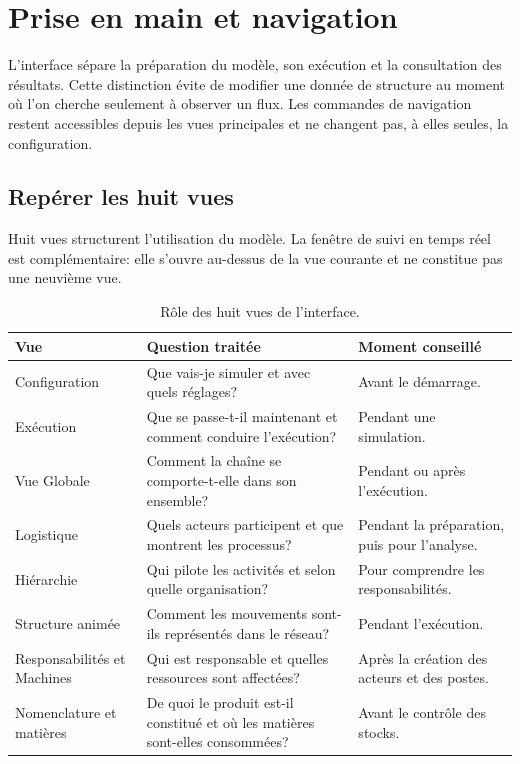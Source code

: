 \chapter{Prise en main et navigation}
\label{chap:prise-en-main}

L'interface sépare la préparation du modèle, son exécution et la consultation des résultats. Cette distinction évite de modifier une donnée de structure au moment où l'on cherche seulement à observer un flux. Les commandes de navigation restent accessibles depuis les vues principales et ne changent pas, à elles seules, la configuration.

\section{Repérer les huit vues}

Huit vues structurent l'utilisation du modèle. La fenêtre de suivi en temps réel est complémentaire: elle s'ouvre au-dessus de la vue courante et ne constitue pas une neuvième vue.

\begin{table}[H]
  \centering
  \begin{tabularx}{\textwidth}{L{0.23\textwidth} L{0.40\textwidth} Y}
    \toprule
    Vue & Question traitée & Moment conseillé \\
    \midrule
    Configuration & Que vais-je simuler et avec quels réglages? & Avant le démarrage. \\
    Exécution & Que se passe-t-il maintenant et comment conduire l'exécution? & Pendant une simulation. \\
    Vue Globale & Comment la chaîne se comporte-t-elle dans son ensemble? & Pendant ou après l'exécution. \\
    Logistique & Quels acteurs participent et que montrent les processus? & Pendant la préparation, puis pour l'analyse. \\
    Hiérarchie & Qui pilote les activités et selon quelle organisation? & Pour comprendre les responsabilités. \\
    Structure animée & Comment les mouvements sont-ils représentés dans le réseau? & Pendant l'exécution. \\
    Responsabilités et Machines & Qui est responsable et quelles ressources sont affectées? & Après la création des acteurs et des postes. \\
    Nomenclature et matières & De quoi le produit est-il constitué et où les matières sont-elles consommées? & Avant le contrôle des stocks. \\
    \bottomrule
  \end{tabularx}
  \caption{Rôle des huit vues de l'interface.}
  \label{tab:huit-vues}
\end{table}

